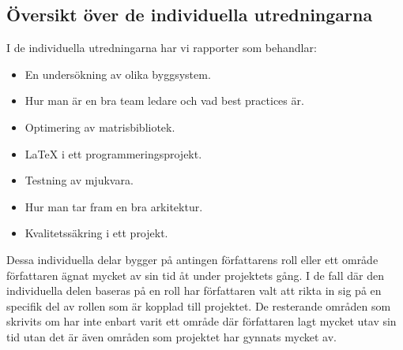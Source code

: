 \subsection{Översikt över de individuella utredningarna}
I de individuella utredningarna har vi rapporter som behandlar: 
\begin{itemize}
	\item En undersökning av olika byggsystem.
	\item Hur man är en bra team ledare och vad best practices är.
	\item Optimering av matrisbibliotek. 
	\item {\LaTeX} i ett programmeringsprojekt.
	\item Testning av mjukvara. 
	\item Hur man tar fram en bra arkitektur. 
	\item Kvalitetssäkring i ett projekt.  
\end{itemize}
Dessa individuella delar bygger på antingen författarens roll eller ett område författaren ägnat mycket av sin tid åt under projektets gång. I de fall där den individuella delen baseras på en roll har författaren valt att rikta in sig på en specifik del av rollen som är kopplad till projektet. De resterande områden som skrivits om har inte enbart varit ett område där författaren lagt mycket utav sin tid utan det är även områden som projektet har gynnats mycket av.

